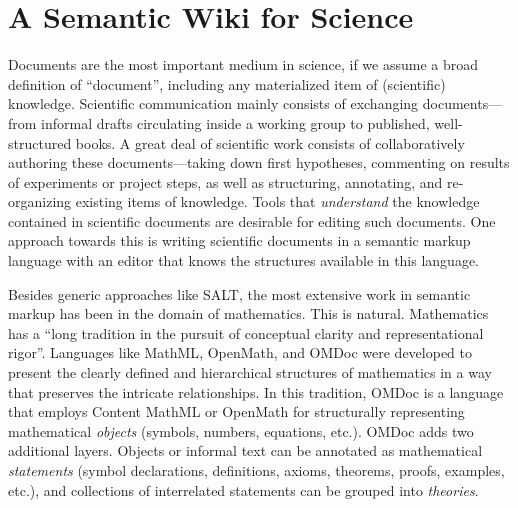 \section{A Semantic Wiki for Science}
\label{sec:science}

\begin{figure}
  \centering
  \vspace{-.9cm}
  \vspace{-1.2cm}
\end{figure}
Documents are the most important medium in science, if we assume a broad definition of
``document'', including any materialized item of (scientific) knowledge.  Scientific
communication mainly consists of exchanging documents---from informal drafts circulating
inside a working group to published, well-structured books.  A great deal of scientific
work consists of collaboratively authoring these documents---taking down first hypotheses,
commenting on results of experiments or project steps, as well as structuring, annotating,
and re-organizing existing items of knowledge.  Tools that
\emph{understand} the knowledge contained in scientific documents are desirable for
editing such documents.  One approach towards this is writing scientific documents in a
semantic markup language with an editor that knows the structures available in this
language.

Besides generic approaches like SALT\cite{Groza:SALT07}, the most
extensive work in semantic markup has been in the domain of
mathematics.  This is natural.  Mathematics has a ``long tradition in
the pursuit of conceptual clarity and representational
rigor''\cite{Kohlhase:omdoc1.2}.  Languages like
MathML\cite{CarlisleEd:MathML07}, OpenMath\cite{BusCapCar:2oms04}, and
OMDoc\cite{Kohlhase:omdoc1.2} were developed to present the clearly defined
and hierarchical structures of mathematics in a way that preserves
the intricate relationships.  In this tradition, 
OMDoc is a language that employs Content MathML
or OpenMath for structurally representing mathematical \emph{objects} (symbols,
numbers, equations, etc.).  OMDoc adds two additional layers.  Objects or informal text can
be annotated as mathematical \emph{statements} (symbol declarations, definitions, axioms,
theorems, proofs, examples, etc.), and collections of interrelated statements can be grouped
into \emph{theories}.

